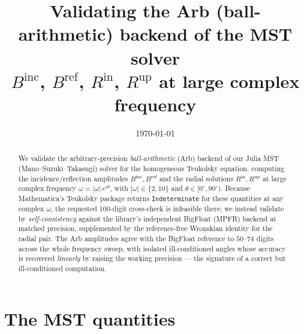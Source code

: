 \documentclass[12pt,a4paper]{article}
\title{Validating the Arb (ball-arithmetic) backend of the MST solver\\
\large $B^{\mathrm{inc}}$, $B^{\mathrm{ref}}$, $R^{\mathrm{in}}$, $R^{\mathrm{up}}$
at large complex frequency}
\author{}
\date{\today}
\newcommand{\Binc}{B^{\mathrm{inc}}}
\newcommand{\Bref}{B^{\mathrm{ref}}}
\newcommand{\Rin}{R^{\mathrm{in}}}
\newcommand{\Rup}{R^{\mathrm{up}}}
\begin{document}
\maketitle

\begin{abstract}
We validate the arbitrary-precision \emph{ball-arithmetic} (Arb) backend of our
Julia MST (Mano--Suzuki--Takasugi) solver for the homogeneous Teukolsky equation,
computing the incidence/reflection amplitudes $\Binc,\Bref$ and the radial
solutions $\Rin,\Rup$ at large complex frequency
$\omega=|\omega|\,e^{i\theta}$, with $|\omega|\in\{2,10\}$ and
$\theta\in[0^\circ,90^\circ)$.  Because Mathematica's \textsf{Teukolsky} package
returns \texttt{Indeterminate} for these quantities at any complex $\omega$, the
requested 100-digit cross-check is infeasible there; we instead validate by
\emph{self-consistency} against the library's independent \textsf{BigFloat}
(MPFR) backend at matched precision, supplemented by the reference-free Wronskian
identity for the radial pair.  The Arb amplitudes agree with the BigFloat
reference to $50$--$74$ digits across the whole frequency sweep, with isolated
ill-conditioned angles whose accuracy is recovered \emph{linearly} by raising the
working precision --- the signature of a correct but ill-conditioned computation.
\end{abstract}

\section{The MST quantities}
\end{document}
